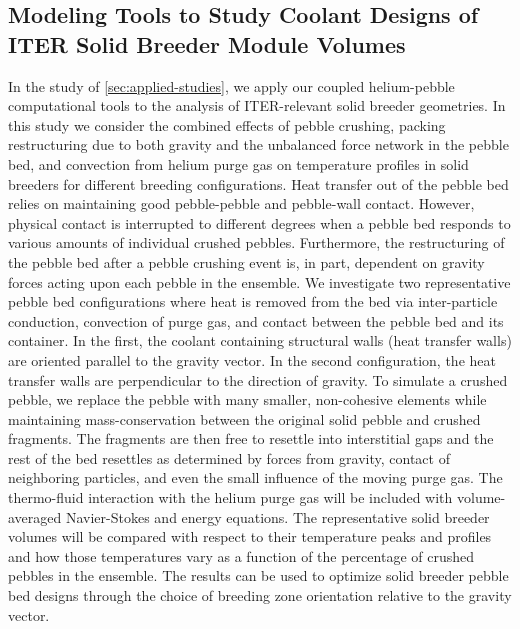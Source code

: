 \subsection*{Modeling Tools to Study Coolant Designs of ITER Solid Breeder Module Volumes}
In the study of \cref{sec:applied-studies}, we apply our coupled helium-pebble computational tools to the analysis of ITER-relevant solid breeder geometries. In this study we consider the combined effects of pebble crushing, packing restructuring due to both gravity and the unbalanced force network in the pebble bed, and convection from helium purge gas on temperature profiles in solid breeders for different breeding configurations. Heat transfer out of the pebble bed relies on maintaining good pebble-pebble and pebble-wall contact. However, physical contact is interrupted to different degrees when a pebble bed responds to various amounts of individual crushed pebbles. Furthermore, the restructuring of the pebble bed after a pebble crushing event is, in part, dependent on gravity forces acting upon each pebble in the ensemble. We investigate two representative pebble bed configurations where heat is removed from the bed via inter-particle conduction, convection of purge gas, and contact between the pebble bed and its container. In the first, the coolant containing structural walls (heat transfer walls) are oriented parallel to the gravity vector. In the second configuration, the heat transfer walls are perpendicular to the direction of gravity. To simulate a crushed pebble, we replace the pebble with many smaller, non-cohesive elements while maintaining mass-conservation between the original solid pebble and crushed fragments. The fragments are then free to resettle into interstitial gaps and the rest of the bed resettles as determined by forces from gravity, contact of neighboring particles, and even the small influence of the moving purge gas. The thermo-fluid interaction with the helium purge gas will be included with volume-averaged Navier-Stokes and energy equations. The representative solid breeder volumes will be compared with respect to their temperature peaks and profiles and how those temperatures vary as a function of the percentage of crushed pebbles in the ensemble. The results can be used to optimize solid breeder pebble bed designs through the choice of breeding zone orientation relative to the gravity vector.



